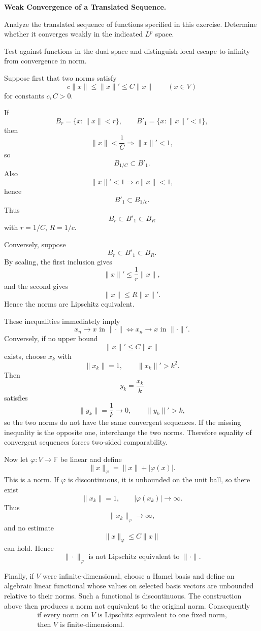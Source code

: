 \begin{problem}[CP-II-0296]
\label{prob:cp-ii-0296}
\textbf{Weak Convergence of a Translated Sequence.}

\hspace*{1.5em}Analyze the translated sequence of functions specified in this exercise.
Determine whether it converges weakly in the indicated \(L^p\) space.

Test against functions in the dual space and distinguish local escape to
infinity from convergence in norm.
\end{problem}

\begin{solution}
Suppose first that two norms satisfy
\[
c\|x\|
\le
\|x\|'
\le
C\|x\|
\qquad(x\in V)
\]
for constants \(c,C>0\).

If
\[
B_r=\{x:\|x\|<r\},
\qquad
B'_1=\{x:\|x\|'<1\},
\]
then
\[
\|x\|<\frac1C
\Longrightarrow
\|x\|'<1,
\]
so
\[
B_{1/C}\subset B'_1.
\]
Also
\[
\|x\|'<1
\Longrightarrow
c\|x\|<1,
\]
hence
\[
B'_1\subset B_{1/c}.
\]
Thus
\[
\boxed{
B_r\subset B'_1\subset B_R
}
\]
with \(r=1/C\), \(R=1/c\).

Conversely, suppose
\[
B_r\subset B'_1\subset B_R.
\]
By scaling, the first inclusion gives
\[
\|x\|'\le\frac1r\|x\|,
\]
and the second gives
\[
\|x\|\le R\|x\|'.
\]
Hence the norms are Lipschitz equivalent.

These inequalities immediately imply
\[
x_n\to x\text{ in }\|\cdot\|
\iff
x_n\to x\text{ in }\|\cdot\|'.
\]
Conversely, if no upper bound
\[
\|x\|'\le C\|x\|
\]
exists, choose \(x_k\) with
\[
\|x_k\|=1,
\qquad
\|x_k\|'>k^2.
\]
Then
\[
y_k=\frac{x_k}{k}
\]
satisfies
\[
\|y_k\|=\frac1k\to0,
\qquad
\|y_k\|'>k,
\]
so the two norms do not have the same convergent sequences. If the missing inequality is the
opposite one, interchange the two norms. Therefore equality of convergent sequences forces
two-sided comparability.

Now let \(\varphi:V\to\mathbb F\) be linear and define
\[
\|x\|_\varphi
=
\|x\|+|\varphi(x)|.
\]
This is a norm. If \(\varphi\) is discontinuous, it is unbounded on the unit ball, so there
exist
\[
\|x_k\|=1,
\qquad
|\varphi(x_k)|\to\infty.
\]
Thus
\[
\|x_k\|_\varphi\to\infty,
\]
and no estimate
\[
\|x\|_\varphi\le C\|x\|
\]
can hold. Hence
\[
\boxed{
\|\cdot\|_\varphi
\text{ is not Lipschitz equivalent to }\|\cdot\|.
}
\]

Finally, if \(V\) were infinite-dimensional, choose a Hamel basis and define an algebraic
linear functional whose values on selected basis vectors are unbounded relative to their
norms. Such a functional is discontinuous. The construction above then produces a norm not
equivalent to the original norm. Consequently
\[
\boxed{
\begin{gathered}
\text{if every norm on }V\text{ is Lipschitz equivalent to one fixed norm,}\\
\text{then }V\text{ is finite-dimensional}.
\end{gathered}
}
\]
\end{solution}


